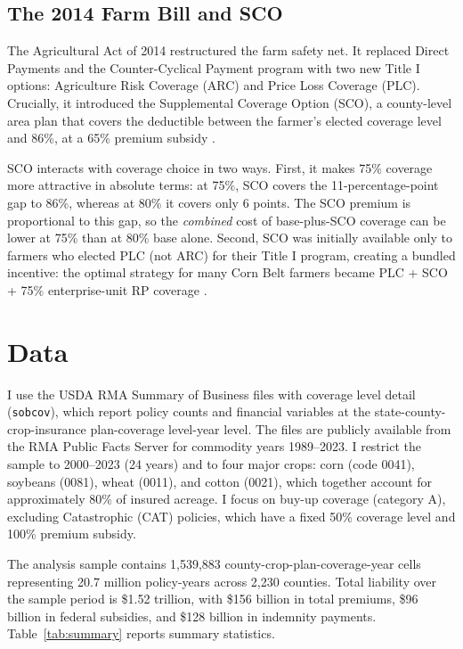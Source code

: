 \documentclass[12pt]{article}
\begin{document}
\subsection{The 2014 Farm Bill and SCO}

The Agricultural Act of 2014 restructured the farm safety net. It replaced Direct Payments and the Counter-Cyclical Payment program with two new Title I options: Agriculture Risk Coverage (ARC) and Price Loss Coverage (PLC). Crucially, it introduced the Supplemental Coverage Option (SCO), a county-level area plan that covers the deductible between the farmer's elected coverage level and 86\%, at a 65\% premium subsidy \citep{zulauf2014}.

SCO interacts with coverage choice in two ways. First, it makes 75\% coverage more attractive in absolute terms: at 75\%, SCO covers the 11-percentage-point gap to 86\%, whereas at 80\% it covers only 6 points. The SCO premium is proportional to this gap, so the \textit{combined} cost of base-plus-SCO coverage can be lower at 75\% than at 80\% base alone. Second, SCO was initially available only to farmers who elected PLC (not ARC) for their Title I program, creating a bundled incentive: the optimal strategy for many Corn Belt farmers became PLC + SCO + 75\% enterprise-unit RP coverage \citep{plastina2018}.


\section{Data}

I use the USDA RMA Summary of Business files with coverage level detail (\texttt{sobcov}), which report policy counts and financial variables at the state-county-crop-insurance plan-coverage level-year level. The files are publicly available from the RMA Public Facts Server for commodity years 1989--2023. I restrict the sample to 2000--2023 (24 years) and to four major crops: corn (code 0041), soybeans (0081), wheat (0011), and cotton (0021), which together account for approximately 80\% of insured acreage. I focus on buy-up coverage (category A), excluding Catastrophic (CAT) policies, which have a fixed 50\% coverage level and 100\% premium subsidy.

The analysis sample contains 1,539,883 county-crop-plan-coverage-year cells representing 20.7 million policy-years across 2,230 counties. Total liability over the sample period is \$1.52 trillion, with \$156 billion in total premiums, \$96 billion in federal subsidies, and \$128 billion in indemnity payments. Table~\ref{tab:summary} reports summary statistics.
\end{document}
